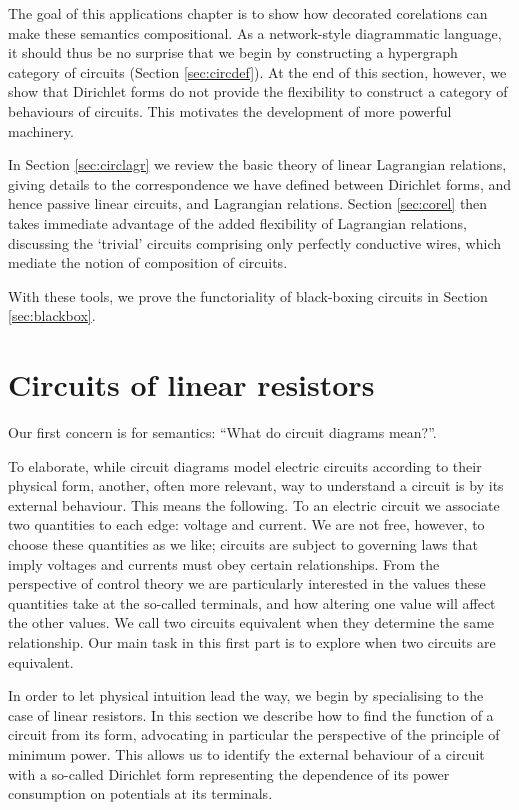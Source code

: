The goal of this applications chapter is to show how decorated corelations can
make these semantics compositional. As a network-style diagrammatic language, it
should thus be no surprise that we begin by constructing a hypergraph category
of circuits (Section \ref{sec:circdef}). At the end of this section, however, we
show that Dirichlet forms do not provide the flexibility to construct a category
of behaviours of circuits.  This motivates the development of more powerful
machinery.

In Section \ref{sec:circlagr} we review the basic theory of linear
Lagrangian relations, giving details to the correspondence we have defined
between Dirichlet forms, and hence passive linear circuits, and Lagrangian
relations. Section \ref{sec:corel} then takes immediate advantage of the added
flexibility of Lagrangian relations, discussing the `trivial' circuits
comprising only perfectly conductive wires, which mediate the notion of composition
of circuits.

With these tools, we prove the functoriality of black-boxing circuits in Section
\ref{sec:blackbox}.

\section{Circuits of linear resistors} \label{sec:resistors}
Our first concern is for semantics: ``What do circuit diagrams mean?''. 

To elaborate, while circuit diagrams model electric circuits according to their
physical form, another, often more relevant, way to understand a circuit is by
its external behaviour. This means the following. To an electric circuit we
associate two quantities to each edge: voltage and current. We are not free,
however, to choose these quantities as we like; circuits are subject to
governing laws that imply voltages and currents must obey certain relationships.
From the perspective of control theory we are particularly interested in the
values these quantities take at the so-called terminals, and how altering one
value will affect the other values. We call two circuits equivalent when they
determine the same relationship. Our main task in this first part is to explore
when two circuits are equivalent.

In order to let physical intuition lead the way, we begin by specialising to the
case of linear resistors. In this section we describe how to find the function
of a circuit from its form, advocating in particular the perspective of the
principle of minimum power. This allows us to identify the external behaviour of a
circuit with a so-called Dirichlet form representing the dependence of its power
consumption on potentials at its terminals.

